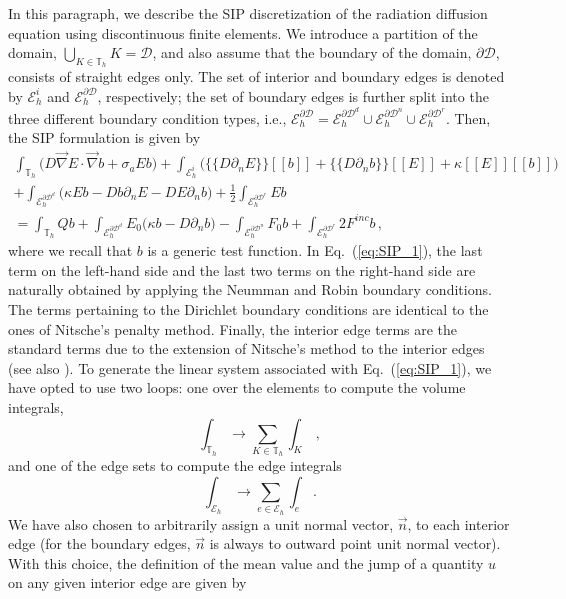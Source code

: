 \documentclass[preprint,10pt]{elsarticle}
\newcommand{\grad}{\vec{\nabla}}
\newcommand{\jmp}[1]{[\![#1]\!]}                     %
\newcommand{\mvl}[1]{\{\!\!\{#1\}\!\!\}}             %
\newcommand{\D}{\mathcal{D}}
\newcommand{\vn}{\vec{n}}
\newcommand{\EI}{\mathcal{E}_h^i}
\newcommand{\ED}{\mathcal{E}_h^{\partial \D^d}}
\newcommand{\EN}{\mathcal{E}_h^{\partial \D^n}}
\newcommand{\ER}{\mathcal{E}_h^{\partial \D^r}}
\newcommand{\eqt}[1]{Eq.~(\ref{#1})}                     %
\newcommand{\tf}{b}
\begin{document}
In this paragraph, we describe the SIP discretization \cite{Kanschat2007} of the 
radiation diffusion equation using discontinuous finite elements. 
We introduce a partition
of the domain, $\bigcup\nolimits_{K\in \mathbb{T}_{h}}K=\D$, and also assume
that the boundary of the domain, $\partial \D$, consists of straight edges only. The 
set of interior and boundary edges is denoted by $\EI$ and $\mathcal{E}_h^{\partial\D}$,
respectively; the set of boundary edges is further split into the three different boundary 
condition types, i.e., $\mathcal{E}_h^{\partial\D} = \ED \cup \EN \cup \ER$. 
Then, the SIP formulation is given by
\begin{multline}
\label{eq:SIP_1}
\int_{\mathbb{T}_{h}} \Big( D \grad E \cdot \grad \tf + \sigma_a E \tf \Big)
+ \int_{\EI} \Big( \mvl{D\partial_n E} \jmp{\tf}  + \mvl{D\partial_n \tf} \jmp{E} + \kappa\jmp{E}\jmp{\tf} \Big)
\\
+ \int_{\ED} \Big( \kappa E \tf -D\tf \partial_n E  -D E \partial_n \tf \Big)
+ \frac{1}{2} \int_{\ER}  E \tf  
\\
=
\int_{\mathbb{T}_{h}} Q \tf 
+ \int_{\ED} E_0 \Big( \kappa \tf  -D \partial_n \tf  \Big)
- \int_{\EN} F_0 \tf  
+ \int_{\ER} 2 F^{inc} \tf  \, ,
\end{multline}
where we recall that $\tf$ is a generic test function. 
In \eqt{eq:SIP_1}, the last term on the left-hand side and the last two terms on the right-hand side 
are naturally obtained by applying the Neumman and Robin boundary conditions. The terms pertaining 
to the Dirichlet boundary conditions are identical to the ones of Nitsche's penalty method. 
Finally, the interior edge terms are the standard terms due to the extension of Nitsche's method to 
the interior edges (see also \cite{qqq}). To generate the linear system associated with \eqt{eq:SIP_1}, 
we have opted to use two loops: one over the elements to compute the volume integrals,
\begin{equation}
\int_{\mathbb{T}_{h}} \longrightarrow \sum_{K \in \mathbb{T}_{h}} \int_{K} \, ,
\end{equation}
and one of the edge sets to compute the edge integrals
\begin{equation}
\int_{\mathcal{E}_h} \longrightarrow \sum_{e \in \mathcal{E}_h} \int_{e} \, .
\end{equation}
We have also chosen to arbitrarily assign a unit normal vector, $\vn$, to each interior edge (for the boundary edges,
$\vn$ is always to outward point unit normal vector). With this choice, the definition of the mean value and the jump of a quantity $u$ on any given interior edge are given by
\end{document}
